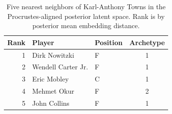 \begin{table}[htbp]
  \centering\small
  \begin{tabular}{rllc}
    \toprule
    Rank & Player & Position & Archetype \\
    \midrule
    1 & Dirk Nowitzki & F & 1 \\
    2 & Wendell Carter Jr. & F & 1 \\
    3 & Eric Mobley & C & 1 \\
    4 & Mehmet Okur & F & 2 \\
    5 & John Collins & F & 1 \\
    \bottomrule
  \end{tabular}
  \caption{Five nearest neighbors of Karl-Anthony Towns in the Procrustes-aligned posterior latent space. Rank is by posterior mean embedding distance.}
  \label{tab:Karl_Anthony_Towns_neighbors}
\end{table}

